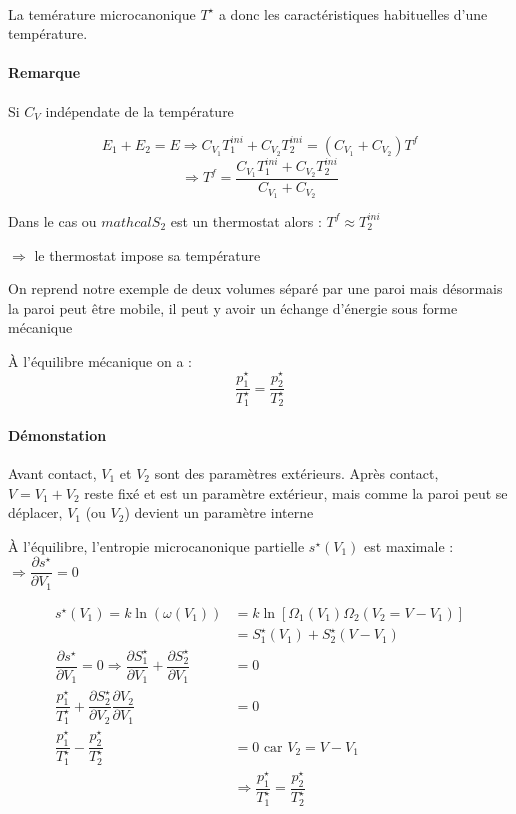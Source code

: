 \documentclass[12pt,a4paper]{report}
\begin{document}
\quad \\ %
La temérature microcanonique \(T^\star\) a donc les caractéristiques habituelles d'une température.

\paragraph{Remarque} Si \(C_V\) indépendate de la température

\[
	E_1 + E_2 = E \Rightarrow C_{V_1} T_1^{ini} + C_{V_2} T_2^{ini} = (C_{V_1} + C_{V_2}) T^f
\]
\[
	\Rightarrow T^f = \dfrac{C_{V_1} T_1^{ini} + C_{V_2} T_2^{ini}}{C_{V_1} + C_{V_2}}
\]

Dans le cas ou \(mathcal{S}_2\) est un thermostat alors : \(T^f \approx T_2^{ini}\)

\(\Rightarrow\) le thermostat impose sa température

On reprend notre exemple de deux volumes séparé par une paroi mais désormais la paroi peut être mobile, il peut y avoir un échange d'énergie sous forme mécanique

À l'équilibre mécanique on a :
\[
	\dfrac{p_1^\star}{T_1^\star} = \dfrac{p_2^\star}{T_2^\star}
\]

\paragraph{Démonstation} \quad \par

Avant contact, \(V_1\) et \(V_2\) sont des paramètres extérieurs. Après contact, \(V = V_1 + V_2\) reste fixé et est un paramètre extérieur, mais comme la paroi peut se déplacer, \(V_1\) (ou \(V_2\)) devient un paramètre interne

À l'équilibre, l'entropie microcanonique partielle \(s^\star (V_1)\) est maximale : \(\Rightarrow \dfrac{\partial s^\star}{\partial V_1} = 0\)

\begin{align*}
	s^\star (V_1) = k \ln (\omega(V_1)) &= k \ln\left[ \Omega_1 (V_1) \Omega_2 (V_2 = V-V_1) \right]\\
	&= S_1^\star (V_1) + S_2^\star (V - V_1)\\
	\dfrac{\partial s^\star}{\partial V_1} = 0 \Rightarrow \dfrac{\partial S_1^\star}{\partial V_1} + \dfrac{\partial S_2^\star}{\partial V_1} &= 0\\
	\dfrac{p_1^\star}{T_1^\star} + \dfrac{\partial S_2^\star}{\partial V_2} \dfrac{\partial V_2}{\partial V_1} &= 0\\
	\dfrac{p_1^\star}{T_1^\star} - \dfrac{p_2^\star}{T_2^\star} &= 0 \text{ car } V_2 = V - V_1\\
	&\Rightarrow \dfrac{p_1^\star}{T_1^\star} = \dfrac{p_2^\star}{T_2^\star}
\end{align*}
\end{document}
